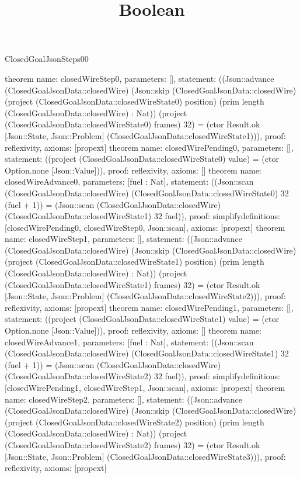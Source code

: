\begin{lexlean}{ClosedGoalJsonSteps00}
\title{Boolean}
\begin{semanticmodule}
theorem{
 name: closedWireStep0, parameters: [],
 statement: ((Json::advance (ClosedGoalJsonData::closedWire) (Json::skip (ClosedGoalJsonData::closedWire) (project (ClosedGoalJsonData::closedWireState0) position) (prim length (ClosedGoalJsonData::closedWire) : Nat)) (project (ClosedGoalJsonData::closedWireState0) frames) 32) = (ctor Result.ok [Json::State, Json::Problem] (ClosedGoalJsonData::closedWireState1))), proof: reflexivity{}, axioms: [propext]
}
theorem{
 name: closedWirePending0, parameters: [],
 statement: ((project (ClosedGoalJsonData::closedWireState0) value) = (ctor Option.none [Json::Value])), proof: reflexivity{}, axioms: []
}
theorem{
 name: closedWireAdvance0, parameters: [fuel : Nat],
 statement: ((Json::scan (ClosedGoalJsonData::closedWire) (ClosedGoalJsonData::closedWireState0) 32 (fuel + 1)) = (Json::scan (ClosedGoalJsonData::closedWire) (ClosedGoalJsonData::closedWireState1) 32 fuel)), proof: simplify{definitions: [closedWirePending0, closedWireStep0, Json::scan]}, axioms: [propext]
}
theorem{
 name: closedWireStep1, parameters: [],
 statement: ((Json::advance (ClosedGoalJsonData::closedWire) (Json::skip (ClosedGoalJsonData::closedWire) (project (ClosedGoalJsonData::closedWireState1) position) (prim length (ClosedGoalJsonData::closedWire) : Nat)) (project (ClosedGoalJsonData::closedWireState1) frames) 32) = (ctor Result.ok [Json::State, Json::Problem] (ClosedGoalJsonData::closedWireState2))), proof: reflexivity{}, axioms: [propext]
}
theorem{
 name: closedWirePending1, parameters: [],
 statement: ((project (ClosedGoalJsonData::closedWireState1) value) = (ctor Option.none [Json::Value])), proof: reflexivity{}, axioms: []
}
theorem{
 name: closedWireAdvance1, parameters: [fuel : Nat],
 statement: ((Json::scan (ClosedGoalJsonData::closedWire) (ClosedGoalJsonData::closedWireState1) 32 (fuel + 1)) = (Json::scan (ClosedGoalJsonData::closedWire) (ClosedGoalJsonData::closedWireState2) 32 fuel)), proof: simplify{definitions: [closedWirePending1, closedWireStep1, Json::scan]}, axioms: [propext]
}
theorem{
 name: closedWireStep2, parameters: [],
 statement: ((Json::advance (ClosedGoalJsonData::closedWire) (Json::skip (ClosedGoalJsonData::closedWire) (project (ClosedGoalJsonData::closedWireState2) position) (prim length (ClosedGoalJsonData::closedWire) : Nat)) (project (ClosedGoalJsonData::closedWireState2) frames) 32) = (ctor Result.ok [Json::State, Json::Problem] (ClosedGoalJsonData::closedWireState3))), proof: reflexivity{}, axioms: [propext]
}
\end{semanticmodule}
\end{lexlean}
